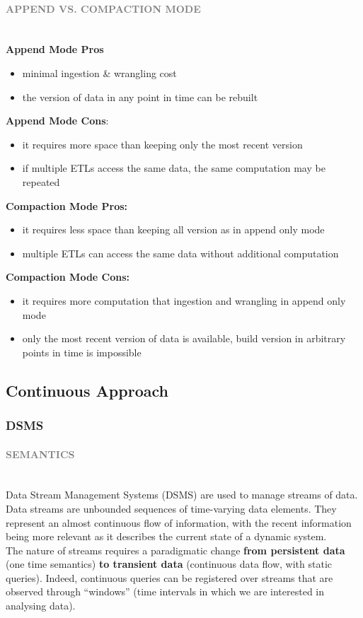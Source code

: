 \documentclass[10pt,a4paper]{article}
\newcommand{\myparagraph}[1]{\paragraph{\normalsize{\textcolor{gray}{\uppercase{\textbf{#1}}}} }\mbox{} \vspace{0.5em}\\}
\begin{document}
\myparagraph{Append vs. Compaction Mode}
\textbf{Append Mode Pros}
\begin{itemize}
	\item minimal ingestion \& wrangling cost
	\item the version of data in any point in time can be rebuilt
\end{itemize}
\textbf{Append Mode Cons}:
\begin{itemize}
	\item it requires more space than keeping only the most recent version
	\item if multiple ETLs access the same data, the same computation may be repeated
\end{itemize}
\textbf{Compaction Mode Pros:}
\begin{itemize}
	\item it requires less space than keeping all version as in append only mode
	\item multiple ETLs can access the same data without additional computation
\end{itemize}
\textbf{Compaction Mode Cons:}
\begin{itemize}
	\item it requires more computation that ingestion and wrangling in append only mode
	\item only the most recent version of data is available, build version in arbitrary points in time is impossible
\end{itemize}

\subsection{Continuous Approach}
\subsubsection{DSMS}
\myparagraph{Semantics}
Data Stream Management Systems (DSMS) are used to manage streams of data. Data streams are unbounded sequences of time-varying data elements. They represent an almost continuous flow of information, with the recent information being more relevant as it describes the current state of a dynamic system. \\
The nature of streams requires a paradigmatic change \textbf{from persistent data} (one time semantics) \textbf{to transient data} (continuous data flow, with static queries). Indeed, continuous queries can be registered over streams that are observed through “windows” (time intervals in which we are interested in analysing data).
\end{document}
